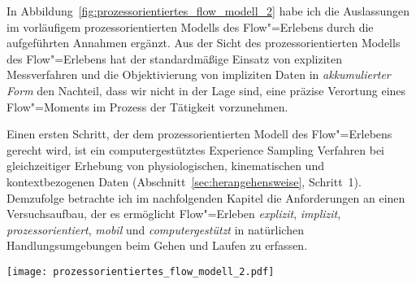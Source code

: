 In Abbildung~\ref{fig:prozessorientiertes_flow_modell_2} habe ich die Auslassungen im vorläufigem prozessorientierten Modells des Flow"=Erlebens durch die aufgeführten Annahmen ergänzt. Aus der Sicht des prozessorientierten Modells des Flow"=Erlebens hat der standardmäßige Einsatz von expliziten Messverfahren und die Objektivierung von impliziten Daten in \emph{akkumulierter Form} den Nachteil, dass wir nicht in der Lage sind, eine präzise Verortung eines Flow"=Moments im Prozess der Tätigkeit vorzunehmen. 

Einen ersten Schritt, der dem prozessorientierten Modell des Flow"=Erlebens gerecht wird, ist ein computergestütztes Experience Sampling Verfahren bei gleichzeitiger Erhebung von physiologischen, kinematischen und kontextbezogenen Daten (Abschnitt~\ref{sec:herangehensweise}, Schritt~1). Demzufolge betrachte ich im nachfolgenden Kapitel die Anforderungen an einen Versuchsaufbau, der es ermöglicht Flow"=Erleben \emph{explizit}, \emph{implizit}, \emph{prozessorientiert}, \emph{mobil} und \emph{computergestützt} in natürlichen Handlungsumgebungen beim Gehen und Laufen zu erfassen.
\begin{sidewaysfigure}
	\texttt{[image: prozessorientiertes\_flow\_modell\_2.pdf]} \caption[Prozessorientiertes Modell des Flow-Erlebens (Erweiterung)]{Prozessorientiertes Modell mit Annahmen zu implizit messbaren Auswirkungen des Flow-Erlebens} \label{fig:prozessorientiertes_flow_modell_2} 
\end{sidewaysfigure}

